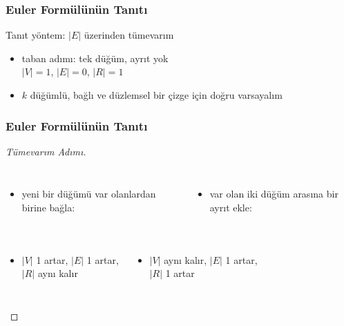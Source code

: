 \documentclass[dvipsnames]{beamer}
\theoremstyle{definition}
\theoremstyle{example}
\theoremstyle{plain}
\begin{document}
\begin{frame}
  \frametitle{Euler Formülünün Tanıtı}

  \begin{block}{Tanıt}
    yöntem: $|E|$ üzerinden tümevarım

    \pause
    \begin{itemize}
      \item taban adımı: tek düğüm, ayrıt yok\\
        $|V| = 1$, $|E| = 0$, $|R| = 1$

      \pause
      \item $k$ düğümlü, bağlı ve düzlemsel bir çizge için doğru varsayalım
    \end{itemize}
  \end{block}
\end{frame}

\begin{frame}
  \frametitle{Euler Formülünün Tanıtı}

  \begin{proof}[Tümevarım Adımı]
    \begin{columns}[t]
      \begin{itemize}
        \item yeni bir düğümü var olanlardan birine bağla:

        \medskip
      \end{itemize}

      \begin{itemize}
        \item var olan iki düğüm arasına bir ayrıt ekle:

        \medskip
      \end{itemize}
    \end{columns}

    \pause
    \begin{columns}
      \begin{itemize}
        \item $|V|$ 1 artar, $|E|$ 1 artar,\\
          $|R|$ aynı kalır
      \end{itemize}

      \pause
      \begin{itemize}
        \item $|V|$ aynı kalır, $|E|$ 1 artar,\\
          $|R|$ 1 artar
      \end{itemize}
    \end{columns}
  \end{proof}
\end{frame}
\end{document}
